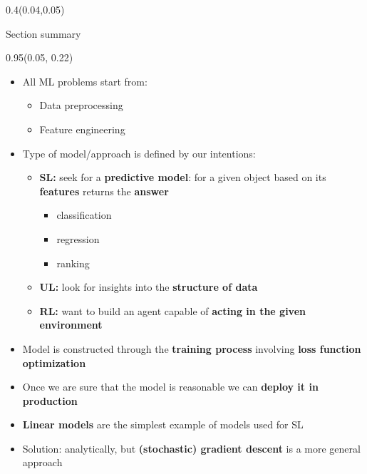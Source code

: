\documentclass[aspectratio=169,usenames,dvipsnames]{beamer}
\newcommand{\myframetitle}[3]{
	\begin{textblock*}{#1}(#2,0.05\vsize)
		\begin{tcolorbox}[colframe=white, colback=mygrey, width=#1,
			arc=2.mm, boxsep=2mm,
			box align=center,
			halign=center,
			valign=center,
			]
			\Large
			\centering
			#3
		\end{tcolorbox}
	\end{textblock*}
}
\newcommand{\mybullet}{$\textcolor{myblack}{\bullet}$}
\newcommand{\mysubbullet}{$\textcolor{myblack}{\circ}$}
\begin{document}

\begin{frame}

\myframetitle{0.4\paperwidth}{0.04\paperwidth}{Section summary}

\begin{textblock*}{0.95\paperwidth}(0.05\paperwidth, 0.22\paperheight)
\begin{itemize}
	\footnotesize
	\itemsep.8ex
	\item[\mybullet] All ML problems start from:
	\begin{itemize}
		\footnotesize
		\item[\mysubbullet] Data preprocessing
		\item[\mysubbullet] Feature engineering
	\end{itemize}
	\item[\mybullet] Type of model/approach is defined by our intentions:
	\begin{itemize}
		\footnotesize
		\item[\mysubbullet] \textcolor{myorange}{\textbf{SL:}} seek for a \textbf{predictive model}: for a given object based on its \textbf{features} returns the \textbf{answer} 
		\begin{itemize}
			\scriptsize
			\item[--] classification
			\item[--] regression
			\item[--] ranking
		\end{itemize}
		\item[\mysubbullet] \textcolor{mypurple}{\textbf{UL:}} look for insights into the \textbf{structure of data}
		\item[\mysubbullet] \textcolor{mygreen}{\textbf{RL:}} want to build an agent capable of \textbf{acting in the given environment}
	\end{itemize}
	\item[\mybullet] Model is constructed through the \textbf{training process} involving \textbf{loss function optimization}
	\item[\mybullet] Once we are sure that the model is reasonable we can \textbf{deploy it in production}
	\item[\mybullet] \textbf{Linear models} are the simplest example of models used for \textcolor{myorange}{SL}
	\item[\mybullet] Solution: analytically, but \textbf{(stochastic) gradient descent} is a more general approach 
\end{itemize}
\end{textblock*}

\transfade[duration=.4]
\end{frame}

\end{document}
